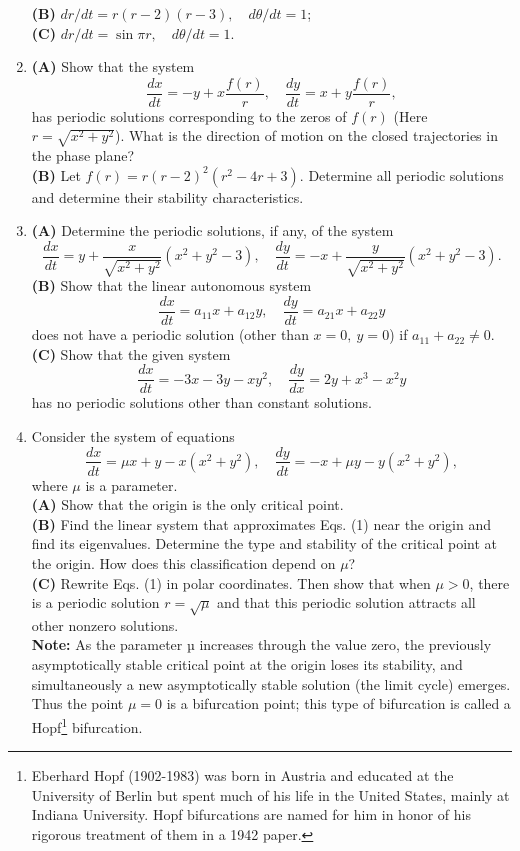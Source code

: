 \documentclass[11pt,a4paper]{article}
\begin{document}
\begin{enumerate}
		\textbf{(B)} $dr/dt = r(r - 2)(r - 3),\quad d\theta/dt = 1$;\\
		\textbf{(C)} $dr/dt = \sin \pi r,\quad d\theta/dt = 1$.
		\item \textbf{(A)} Show that the system
		$$
		\frac{dx}{dt} = -y + x\frac{f(r)}{r},\quad \frac{dy}{dt} = x + y\frac{f(r)}{r},
		$$
		has periodic solutions corresponding to the zeros of $f(r)$ (Here $r = \sqrt{x^2+y^2}$). What is the direction of motion on the closed trajectories in the phase plane?\\
		\textbf{(B)}  Let $f(r) = r(r - 2)^2(r^2 - 4r + 3)$. Determine all periodic solutions and determine their stability characteristics.
		\item \textbf{(A)} Determine the periodic solutions, if any, of the system
		$$
		\frac{dx}{dt} = y + \frac{x}{\sqrt{x^2 + y^2}}(x^2 + y^2 - 3),\quad \frac{dy}{dt} = -x + \frac{y}{\sqrt{x^2 + y^2}}(x^2 + y^2 - 3).
		$$
		\textbf{(B)} Show that the linear autonomous system
		$$
		\frac{dx}{dt} = a_{11}x + a_{12}y,\quad \frac{dy}{dt} = a_{21}x + a_{22}y
		$$
		does not have a periodic solution (other than $x = 0,\ y = 0$) if $a_{11} + a_{22} \neq 0$.\\
		\textbf{(C)} Show that the given system
		$$
		\frac{dx}{dt} = -3x -3y - xy^2,\quad \frac{dy}{dx} = 2y + x^3 - x^2y
		$$
		has no periodic solutions other than constant solutions.
		\item Consider the system of equations
		\begin{equation}
			\frac{dx}{dt} = \mu x + y - x(x^2 + y^2),\quad \frac{dy}{dt} = -x + \mu y -y(x^2 + y^2),
		\end{equation}
		where $\mu$ is a parameter.\\
		\textbf{(A)} Show that the origin is the only critical point.\\
		\textbf{(B)} Find the linear system that approximates Eqs. (1) near the origin and find its eigenvalues. Determine the type and stability of the critical point at the origin. How does this classification depend on $\mu$?\\
		\textbf{(C)} Rewrite Eqs. (1) in polar coordinates. Then show that when $\mu > 0$, there is a periodic solution $r = \sqrt{\mu}$ and that this periodic solution attracts all other nonzero solutions.\\
		\textbf{Note:} As the parameter µ increases through the value zero, the previously asymptotically stable critical point at the origin loses its stability, and simultaneously a new asymptotically stable solution (the limit cycle) emerges. Thus the point $\mu = 0$ is a bifurcation point; this type of bifurcation is called a Hopf\footnote{Eberhard Hopf (1902-1983) was born in Austria and educated at the University of Berlin but spent much of his life in the United States, mainly at Indiana University. Hopf bifurcations are named for him in honor of his rigorous treatment of them in a 1942 paper.} bifurcation.

\end{enumerate}
\end{document}
